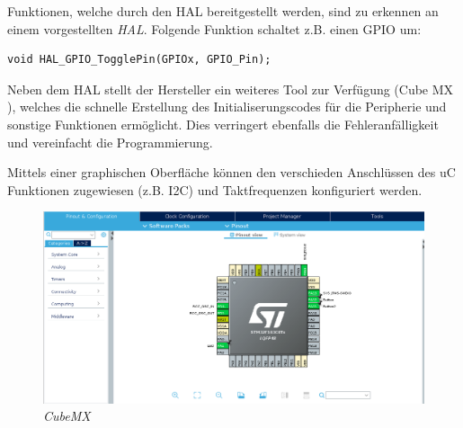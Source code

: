 \smallskip

Funktionen, welche durch den \ac{HAL} bereitgestellt werden, sind zu erkennen an einem vorgestellten \textit{HAL}. Folgende Funktion schaltet z.B. einen \ac{GPIO} um:

\smallskip

\begin{lstlisting}[caption={\textit{Umschalten von \acs{GPIO}}}]
   void HAL_GPIO_TogglePin(GPIOx, GPIO_Pin);
\end{lstlisting}

\smallskip

Neben dem \ac{HAL} stellt der Hersteller ein weiteres Tool zur Verfügung (Cube MX \citep{CubeMX}), welches die schnelle Erstellung des Initialiserungscodes 
für die Peripherie und sonstige Funktionen ermöglicht. Dies verringert ebenfalls die Fehleranfälligkeit und vereinfacht die Programmierung.

\smallskip

Mittels einer graphischen Oberfläche können den verschieden Anschlüssen des \ac{uC} Funktionen zugewiesen (z.B. \acs{I2C}) und Taktfrequenzen
konfiguriert werden.

\vspace{0.5cm}

\begin{figure}[h]
    \vspace{-\baselineskip}
        \centering
        \includegraphics[scale=0.3]{Pictures/cubeMX.png}
        \caption{\textit{CubeMX}}
        \label{img:CubeMX}
\end{figure}